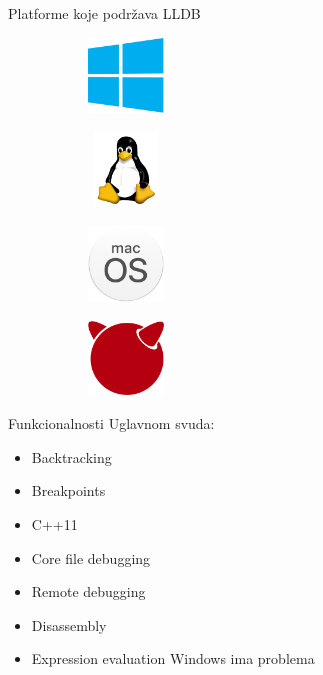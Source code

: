 \documentclass[bookmarks=true,bookmarksopen=true,pdfborder={0 0 0},pdfhighlight={/N},linkbordercolor={.5 .5 .5},implicit=false,unicode,xcolor={table}]{beamer}
\begin{document}
\begin{frame}{}
\end{frame}

\begin{frame}{Platforme koje podržava LLDB}
	\begin{figure}
		
		\begin{subfigure}{2cm}
			\includegraphics[width=2cm,height=2cm]{windows_logo}
		\end{subfigure}
		\begin{subfigure}{2cm}
			\includegraphics[width=2cm,height=2cm]{linux_logo}
		\end{subfigure}
		\begin{subfigure}{2cm}
			\includegraphics[width=2cm,height=2cm]{mac_os}
		\end{subfigure}
		\begin{subfigure}{2cm}
			\includegraphics[width=2cm,height=2cm]{free_bsd}
		\end{subfigure}
	\end{figure}
\end{frame}

\begin{frame}{Funkcionalnosti}
	Uglavnom svuda:
	\begin{itemize}
		\item Backtracking 
		\item Breakpoints
		\item C++11
		\item Core file debugging
		\item Remote debugging
		\item Disassembly
		\item Expression evaluation {Windows ima problema}
	\end{itemize}
\end{frame}
\end{document}
